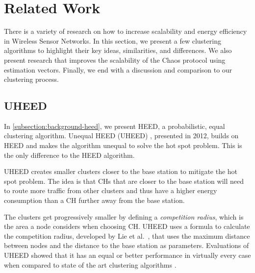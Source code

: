 \chapter{Related Work}
\label{chap:related-research}
There is a variety of research on how to increase scalability and energy efficiency in Wireless Sensor Networks. In this section, we present a few clustering algorithms to highlight their key ideas, similarities, and differences. We also present research that improves the scalability of the Chaos protocol using estimation vectors. Finally, we end with a discussion and comparison to our clustering process.

\section{UHEED}
In \cref{subsection:background-heed}, we present HEED, a probabilistic, equal clustering algorithm. Unequal HEED (UHEED) \cite{Ever2012-UHEED}, presented in 2012, builds on HEED and makes the algorithm unequal to solve the hot spot problem. This is the only difference to the HEED algorithm.

UHEED creates smaller clusters closer to the base station to mitigate the hot spot problem. The idea is that CHs that are closer to the base station will need to route more traffic from other clusters and thus have a higher energy consumption than a CH further away from the base station.

The clusters get progressively smaller by defining a \textit{competition radius}, which is the area a node considers when choosing CH. UHEED uses a formula to calculate the competition radius, developed by Lie et al.~\cite{Li2005-EEUC}, that uses the maximum distance between nodes and the distance to the base station as parameters. Evaluations of UHEED showed that it has an equal or better performance in virtually every case when compared to state of the art clustering algorithms \cite{Ever2012-UHEED}.

